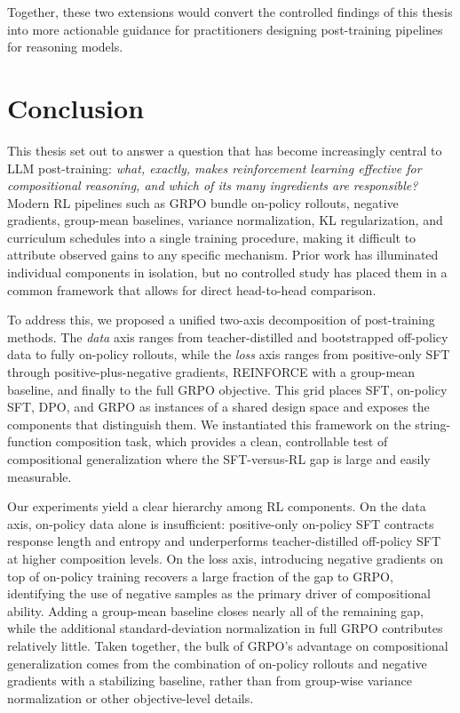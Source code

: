 \documentclass[12pt]{cmuthesis}
\begin{document}
Together, these two extensions would convert the controlled findings of this thesis into more actionable guidance for practitioners designing post-training pipelines for reasoning models.


\chapter{Conclusion}

This thesis set out to answer a question that has become increasingly central to LLM post-training: \emph{what, exactly, makes reinforcement learning effective for compositional reasoning, and which of its many ingredients are responsible?} Modern RL pipelines such as GRPO bundle on-policy rollouts, negative gradients, group-mean baselines, variance normalization, KL regularization, and curriculum schedules into a single training procedure, making it difficult to attribute observed gains to any specific mechanism. Prior work has illuminated individual components in isolation, but no controlled study has placed them in a common framework that allows for direct head-to-head comparison.

To address this, we proposed a unified two-axis decomposition of post-training methods. The \emph{data} axis ranges from teacher-distilled and bootstrapped off-policy data to fully on-policy rollouts, while the \emph{loss} axis ranges from positive-only SFT through positive-plus-negative gradients, REINFORCE with a group-mean baseline, and finally to the full GRPO objective. This grid places SFT, on-policy SFT, DPO, and GRPO as instances of a shared design space and exposes the components that distinguish them. We instantiated this framework on the string-function composition task, which provides a clean, controllable test of compositional generalization where the SFT-versus-RL gap is large and easily measurable.

Our experiments yield a clear hierarchy among RL components. On the data axis, on-policy data alone is insufficient: positive-only on-policy SFT contracts response length and entropy and underperforms teacher-distilled off-policy SFT at higher composition levels. On the loss axis, introducing negative gradients on top of on-policy training recovers a large fraction of the gap to GRPO, identifying the use of negative samples as the primary driver of compositional ability. Adding a group-mean baseline closes nearly all of the remaining gap, while the additional standard-deviation normalization in full GRPO contributes relatively little. Taken together, the bulk of GRPO's advantage on compositional generalization comes from the combination of on-policy rollouts and negative gradients with a stabilizing baseline, rather than from group-wise variance normalization or other objective-level details.
\end{document}
